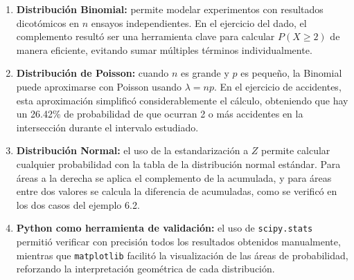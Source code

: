 \documentclass[12pt,a4paper]{article}
\begin{document}
\begin{enumerate}
    \item \textbf{Distribución Binomial:} permite modelar experimentos con resultados
    dicotómicos en $n$ ensayos independientes. En el ejercicio del dado, el complemento
    resultó ser una herramienta clave para calcular $P(X \geq 2)$ de manera eficiente,
    evitando sumar múltiples términos individualmente.
 
    \item \textbf{Distribución de Poisson:} cuando $n$ es grande y $p$ es pequeño, la
    Binomial puede aproximarse con Poisson usando $\lambda = np$. En el ejercicio de
    accidentes, esta aproximación simplificó considerablemente el cálculo, obteniendo
    que hay un 26.42\% de probabilidad de que ocurran 2 o más accidentes en la
    intersección durante el intervalo estudiado.
 
    \item \textbf{Distribución Normal:} el uso de la estandarización a $Z$ permite calcular
    cualquier probabilidad con la tabla de la distribución normal estándar. Para áreas
    a la derecha se aplica el complemento de la acumulada, y para áreas entre dos
    valores se calcula la diferencia de acumuladas, como se verificó en los dos casos
    del ejemplo 6.2.
 
    \item \textbf{Python como herramienta de validación:} el uso de \texttt{scipy.stats}
    permitió verificar con precisión todos los resultados obtenidos manualmente, mientras
    que \texttt{matplotlib} facilitó la visualización de las áreas de probabilidad,
    reforzando la interpretación geométrica de cada distribución.
\end{enumerate}
 
\end{document}
